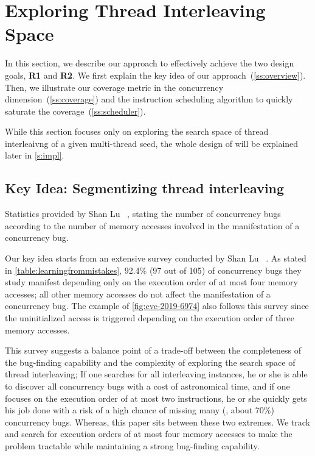 \section{Exploring Thread Interleaving Space}
\label{s:design}

In this section, we describe our approach to effectively achieve the
two design goals, \textbf{R1} and \textbf{R2}.
%
We first explain the key idea of our
approach~(\autoref{ss:overview}). Then, we illustrate our coverage
metric in the concurrency dimension~(\autoref{ss:coverage}) and the
instruction scheduling algorithm to quickly saturate the
coverage~(\autoref{ss:scheduler}).


%
While this section focuses only on exploring the search space of
thread interleaivng of a given multi-thread seed, the whole design of
\sys will be explained later in \autoref{s:impl}.


\subsection{Key Idea: Segmentizing thread interleaving}
\label{ss:overview}


\begin{table}[t]
  \centering
  
  \caption{Statistics provided by Shan Lu
    \etal~\cite{learningfrommistakes}, stating the number of
    concurrency bugs according to the number of memory accesses
    involved in the manifestation of a concurrency bug.}
  \label{table:learningfrommistakes}
\end{table}

Our key idea starts from an extensive survey conducted by Shan Lu
\etal~\cite{learningfrommistakes}.
%
As stated in \autoref{table:learningfrommistakes}, 92.4\% (97 out of
105) of concurrency bugs they study manifest depending only on the
execution order of at most four memory accesses; all other memory
accesses do not affect the manifestation of a concurrency bug.
%
The example of \autoref{fig:cve-2019-6974} also follows this survey
since the uninitialized access is triggered depending on the execution
order of three memory accesses.


This survey suggests a balance point of a trade-off between the
completeness of the bug-finding capability and the complexity of
exploring the search space of thread interleaving;
%
If one searches for all interleaving instances, he or she is able to
discover all concurrency bugs with a cost of astronomical time, and
if one focuses on the execution order of at most two instructions, he
or she quickly gets his job done with a risk of a high chance of
missing many (\eg, about 70\%) concurrency bugs.
%
Whereas, this paper sits between these two extremes. We track and
search for execution orders of at most four memory accesses to make
the problem tractable while maintaining a strong bug-finding
capability.



